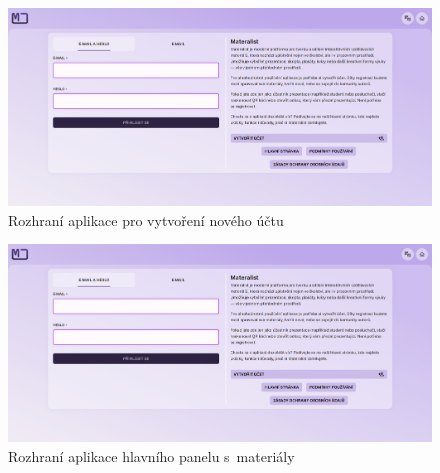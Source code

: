 \begin{figure}[ht!]
    \centering
    \includegraphics[width=1\textwidth,page=7]{media/appendix/uzivatelskeProstredi.pdf}
    \caption{Rozhraní aplikace pro vytvoření nového účtu}
\end{figure}


\begin{figure}[ht!]
    \centering
    \includegraphics[width=1\textwidth,page=2]{media/appendix/uzivatelskeProstredi.pdf}
    \caption{Rozhraní aplikace hlavního panelu s~materiály}
\end{figure}

